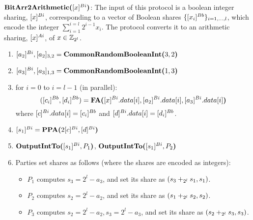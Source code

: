 \begin{protocol}
	$\textbf{BitArr2Arithmetic(}[x]^{Bi}\textbf{)}$:
    The input of this protocol is a boolean integer sharing, $[x]^{Bi}$, corresponding to a vector of Boolean shares $\{[x_i]^{Bb}\}_{i = 1, \ldots, l}$, which encode the integer $\sum_{i = 1}^{i = l}2^{i - 1}x_i$.
    The protocol converts it to an arithmetic sharing, $[x]^{Ai}$, of $x \in \mathbb{Z}_{2^l}$.
	\begin{enumerate}
        \item $[a_2]^{Bi}, [a_2]_{3,2} = \textbf{CommonRandomBooleanInt(}3, 2\textbf{)}$
        \item $[a_3]^{Bi}, [a_3]_{1,3} = \textbf{CommonRandomBooleanInt(}1, 3\textbf{)}$
        \item for $i = 0$ to $i = l - 1$ (in parallel):
            $$([c_i]^{Bb}, [d_i]^{Bb}) = \textbf{FA(}[x]^{Bi}.data[i],[a_2]^{Bi}.data[i],[a_3]^{Bi}.data[i]\textbf{)}$$
        where $[c]^{Bi}.data[i] = [c_i]^{Bb}$ and $[d]^{Bi}.data[i] = [d_i]^{Bb}$.
        \item $[s_1]^{Bi} = \textbf{PPA(}2[c]^{Bi},[d]^{Bi}\textbf{)}$
        \item $\textbf{OutputIntTo(}[s_1]^{Bi}, P_{1}\textbf{)}$, $\textbf{OutputIntTo(}[s_1]^{Bi}, P_{2}\textbf{)}$
        \item Parties set shares as follows (where the shares are encoded as integers):  
        \begin{itemize}
            \item $P_1$ computes $s_3 = 2^l - a_3$, and set its share as $(s_3 +_{2^l} s_1, s_1)$.
            \item $P_2$ computes $s_2 = 2^l - a_2$, and set its share as $(s_1 +_{2^l} s_2, s_2)$.
            \item $P_3$ computes $s_2 = 2^l - a_2, s_3 = 2^l - a_3$, and set its share as $(s_2 +_{2^l} s_3, s_3)$.
        \end{itemize}
	\end{enumerate}
\end{protocol}